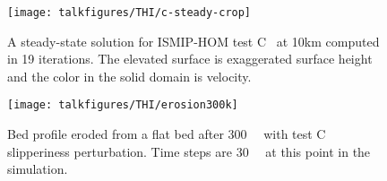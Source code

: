 \begin{figure}\centering
  \texttt{[image: talkfigures/THI/c-steady-crop]}
  \caption{A steady-state solution for ISMIP-HOM test C~\citep{pattyn2008beh} at 10km computed in 19 iterations.
    The elevated surface is exaggerated surface height and the color in the solid domain is velocity.}\label{fig:hstat:csteady}
\end{figure}

\begin{figure}\centering
  \texttt{[image: talkfigures/THI/erosion300k]}
  \caption{Bed profile eroded from a flat bed after \SI{300}{\kilo\year} with test C slipperiness perturbation.
    Time steps are \SI{30}{\kilo\year} at this point in the simulation.}\label{fig:hstat:erosion300k}
\end{figure}
